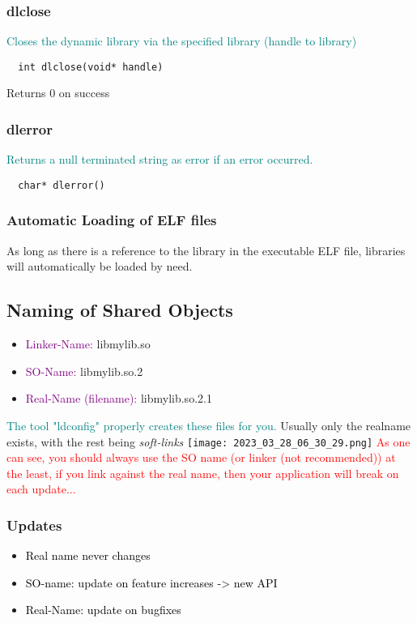\documentclass[main.tex,fontsize=8pt,paper=a4,paper=portrait,DIV=calc,]{scrartcl}
\begin{document}
\subsubsection{dlclose}
\textcolor{teal}{Closes the dynamic library via the specified library (handle to library)}
\begin{lstlisting}
  int dlclose(void* handle)
\end{lstlisting}
Returns 0 on success

\subsubsection{dlerror}
\textcolor{teal}{Returns a null terminated string as error if an error occurred.}
\begin{lstlisting}
  char* dlerror()
\end{lstlisting}

\subsubsection{Automatic Loading of ELF files}
As long as there is a reference to the library in the executable ELF file, libraries will automatically be loaded by need.

\subsection{Naming of Shared Objects}
\begin{itemize}
\item \textcolor{purple}{Linker-Name:} libmylib.so 
\item \textcolor{purple}{SO-Name:} libmylib.so.2
\item \textcolor{purple}{Real-Name (filename): } libmylib.so.2.1
\end{itemize} 
\textcolor{teal}{The tool "ldconfig" properly creates these files for you.}\newline
Usually only the realname exists, with the rest being \emph{soft-links}\newline
\texttt{[image: 2023\_03\_28\_06\_30\_29.png]}\newline
\textcolor{red}{As one can see, you should always use the SO name (or linker (not recommended)) at the least, if you link against the real name, then your application will break on each update...}

\subsubsection{Updates}
\begin{itemize}
\item \textcolor{black}{Real name never changes}
\item \textcolor{black}{SO-name: update on feature increases -> new API}
\item \textcolor{black}{Real-Name: update on bugfixes}
\end{itemize} 
\end{document}

